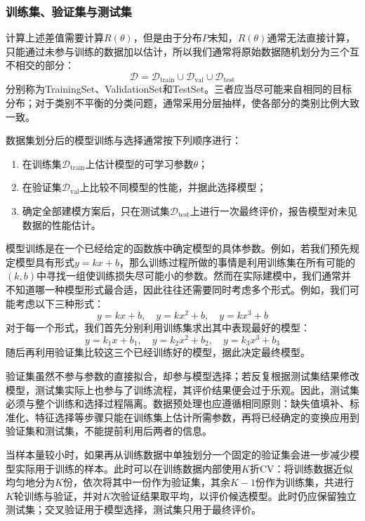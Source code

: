 \subsubsection{训练集、验证集与测试集}
计算上述差值需要计算$R(\theta)$，但是由于分布$P$未知，$R(\theta)$通常无法直接计算，只能通过未参与训练的数据加以估计，所以我们通常将原始数据随机划分为三个互不相交的部分：
\begin{equation*}
	\mathcal{D}=\mathcal{D}_{\mathrm{train}}\cup\mathcal{D}_{\mathrm{val}}\cup\mathcal{D}_{\mathrm{test}}
\end{equation*}
分别称为\gls{TrainingSet}、\gls{ValidationSet}和\gls{TestSet}。三者应当尽可能来自相同的目标分布；对于类别不平衡的分类问题，通常采用分层抽样，使各部分的类别比例大致一致。\par
\begin{method}
	数据集划分后的模型训练与选择通常按下列顺序进行：
	\begin{enumerate}
		\item 在训练集$\mathcal{D}_{\mathrm{train}}$上估计模型的可学习参数$\theta$；
		\item 在验证集$\mathcal{D}_{\mathrm{val}}$上比较不同模型的性能，并据此选择模型；
		\item 确定全部建模方案后，只在测试集$\mathcal{D}_{\mathrm{test}}$上进行一次最终评价，报告模型对未见数据的性能估计。
	\end{enumerate}
\end{method}
模型训练是在一个已经给定的函数族中确定模型的具体参数。例如，若我们预先规定模型具有形式$y=kx+b$，那么训练过程所做的事情是利用训练集在所有可能的$(k,b)$中寻找一组使训练损失尽可能小的参数。然而在实际建模中，我们通常并不知道哪一种模型形式最合适，因此往往还需要同时考虑多个形式。例如，我们可能考虑以下三种形式：
\begin{equation*}
	y=kx+b,\quad y=kx^2+b,\quad y=kx^3+b
\end{equation*}
对于每一个形式，我们首先分别利用训练集求出其中表现最好的模型：
\begin{equation*}
	y=k_1x+b_1,\quad y=k_2x^2+b_2,\quad y=k_3x^3+b_3
\end{equation*}
随后再利用验证集比较这三个已经训练好的模型，据此决定最终模型。\par
验证集虽然不参与参数的直接拟合，却参与模型选择；若反复根据测试集结果修改模型，测试集实际上也参与了训练流程，其评价结果便会过于乐观。因此，测试集必须与整个训练和选择过程隔离。数据预处理也应遵循相同原则：缺失值填补、标准化、特征选择等步骤只能在训练集上估计所需参数，再将已经确定的变换应用到验证集和测试集，不能提前利用后两者的信息。\par
当样本量较小时，如果再从训练数据中单独划分一个固定的验证集会进一步减少模型实际用于训练的样本。此时可以在训练数据内部使用$K$折\gls{CV}：将训练数据近似均匀地分为$K$份，依次将其中一份作为验证集，其余$K-1$份作为训练集，共进行$K$轮训练与验证，并对$K$次验证结果取平均，以评价候选模型。此时仍应保留独立测试集；交叉验证用于模型选择，测试集只用于最终评价。
